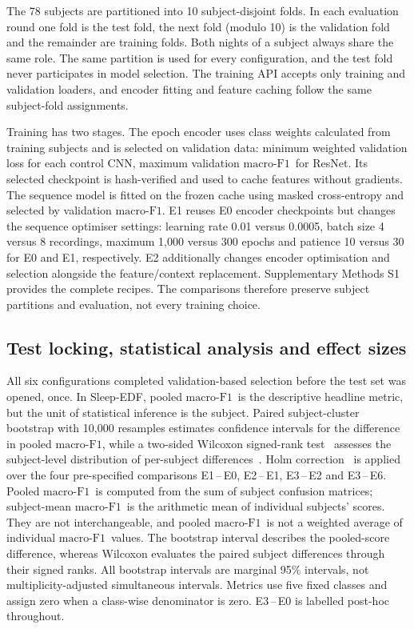\documentclass[11pt,a4paper]{article}
\newcommand{\mf}{\ensuremath{\mathrm{macro\text{-}F1}}}
\begin{document}
The 78 subjects are partitioned into 10 subject-disjoint folds. In each evaluation round one fold is the
test fold, the next fold (modulo 10) is the validation fold and the remainder are training folds. Both
nights of a subject always share the same role. The same partition is used for every configuration, and
the test fold never participates in model selection. The training API accepts only training and
validation loaders, and encoder fitting and feature caching follow the same subject-fold assignments.

Training has two stages. The epoch encoder uses class weights calculated from training subjects and
is selected on validation data: minimum weighted validation loss for each control CNN, maximum
validation \mf\ for ResNet. Its selected checkpoint is hash-verified and used to cache features
without gradients. The sequence model is fitted on the frozen cache using masked cross-entropy and
selected by validation \mf. E1 reuses E0 encoder checkpoints but changes the sequence optimiser
settings: learning rate 0.01 versus 0.0005, batch size 4 versus 8 recordings, maximum 1{,}000 versus
300 epochs and patience 10 versus 30 for E0 and E1, respectively. E2 additionally changes encoder
optimisation and selection alongside the feature/context replacement. Supplementary Methods S1
provides the complete recipes. The comparisons therefore preserve subject partitions and evaluation,
not every training choice.

\subsection{Test locking, statistical analysis and effect sizes}

All six configurations completed validation-based selection before the test set was opened, once. In
Sleep-EDF, pooled \mf\ is the descriptive headline metric, but the unit of statistical inference is the
subject. Paired subject-cluster bootstrap with 10{,}000 resamples estimates confidence intervals for the
difference in pooled \mf, while a two-sided Wilcoxon signed-rank test~\cite{wilcoxon1945} assesses the
subject-level distribution of per-subject differences~\cite{efron1994bootstrap}. Holm
correction~\cite{holm1979} is applied over the four pre-specified comparisons E1\,--\,E0, E2\,--\,E1,
E3\,--\,E2 and E3\,--\,E6. Pooled \mf\ is computed from the sum of subject confusion matrices;
subject-mean \mf\ is the arithmetic mean of individual subjects' scores. They are not interchangeable,
and pooled \mf\ is not a weighted average of individual \mf\ values. The bootstrap interval describes
the pooled-score difference, whereas Wilcoxon evaluates the paired subject differences through their
signed ranks. All bootstrap intervals are marginal 95\% intervals, not multiplicity-adjusted simultaneous
intervals. Metrics use five fixed classes and assign zero when a class-wise denominator is zero.
E3\,--\,E0 is labelled post-hoc throughout.
\end{document}
